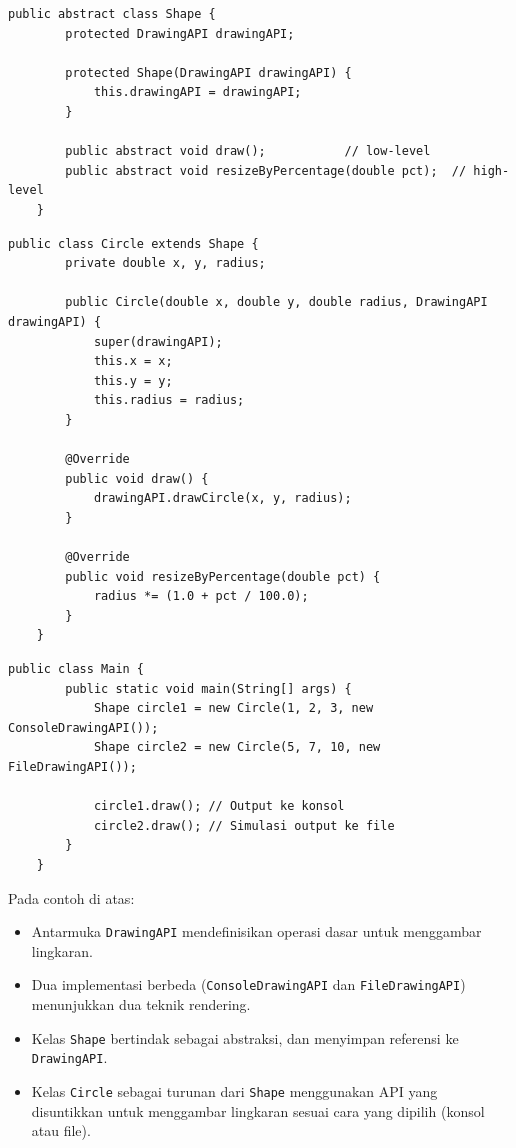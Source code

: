 \begin{lstlisting}[style=JavaStyle, caption={Abstraksi: Shape}, label={lst:bridge-abstraction}]
	public abstract class Shape {
		protected DrawingAPI drawingAPI;
		
		protected Shape(DrawingAPI drawingAPI) {
			this.drawingAPI = drawingAPI;
		}
		
		public abstract void draw();           // low-level
		public abstract void resizeByPercentage(double pct);  // high-level
	}
\end{lstlisting}

\begin{lstlisting}[style=JavaStyle, caption={Abstraksi Konkret: Circle}, label={lst:bridge-circle}]
	public class Circle extends Shape {
		private double x, y, radius;
		
		public Circle(double x, double y, double radius, DrawingAPI drawingAPI) {
			super(drawingAPI);
			this.x = x;
			this.y = y;
			this.radius = radius;
		}
		
		@Override
		public void draw() {
			drawingAPI.drawCircle(x, y, radius);
		}
		
		@Override
		public void resizeByPercentage(double pct) {
			radius *= (1.0 + pct / 100.0);
		}
	}
\end{lstlisting}

\begin{lstlisting}[style=JavaStyle, caption={Client: Menggunakan Bridge Pattern}, label={lst:bridge-main}]
	public class Main {
		public static void main(String[] args) {
			Shape circle1 = new Circle(1, 2, 3, new ConsoleDrawingAPI());
			Shape circle2 = new Circle(5, 7, 10, new FileDrawingAPI());
			
			circle1.draw(); // Output ke konsol
			circle2.draw(); // Simulasi output ke file
		}
	}
\end{lstlisting}

Pada contoh di atas:
\begin{itemize}
	\item Antarmuka \texttt{DrawingAPI} mendefinisikan operasi dasar untuk menggambar lingkaran.
	\item Dua implementasi berbeda (\texttt{ConsoleDrawingAPI} dan \texttt{FileDrawingAPI}) menunjukkan dua teknik rendering.
	\item Kelas \texttt{Shape} bertindak sebagai abstraksi, dan menyimpan referensi ke \texttt{DrawingAPI}.
	\item Kelas \texttt{Circle} sebagai turunan dari \texttt{Shape} menggunakan API yang disuntikkan untuk menggambar lingkaran sesuai cara yang dipilih (konsol atau file).
\end{itemize}

